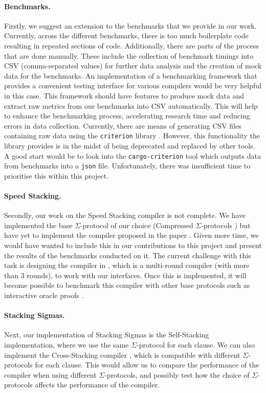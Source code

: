 \paragraph{Benchmarks.} Firstly, we suggest an extension to the benchmarks that we provide in our work. Currently, across the different benchmarks, there is too much boilerplate code resulting in repeated sections of code. Additionally, there are parts of the process that are done manually. These include the collection of benchmark timings into CSV (comma-separated values) for further data analysis and the creation of mock data for the benchmarks. An implementation of a benchmarking framework that provides a convenient testing interface for various compilers would be very helpful in this case. This framework should have features to produce mock data and extract raw metrics from our benchmarks into CSV automatically. This will help to enhance the benchmarking process, accelerating research time and reducing errors in data collection. Currently, there are means of generating CSV files containing raw data using the \texttt{criterion} library \cite{criterion}. However, this functionality the library provides is in the midst of being deprecated and replaced by other tools. A good start would be to look into the \texttt{cargo-criterion} tool \cite{criterion} which outputs data from benchmarks into a \texttt{json} file. Unfortunately, there was insufficient time to prioritise this within this project. 

\paragraph{Speed Stacking.} Secondly, our work on the 
Speed Stacking compiler \cite{SpeedStacking} is not complete. We have implemented the base $\Sigma$-protocol of our choice (Compressed $\Sigma$-protocols \cite{attema}) but have yet to implement the compiler proposed in the paper \cite{SpeedStacking}. Given more time, we would have wanted to include this in our contributions to this project and present the results of the benchmarks conducted on it. The current challenge with this task is designing the compiler in \cite{SpeedStacking}, which is a multi-round compiler (with more than 3 rounds), to work with our interfaces. Once this is implemented, it will become possible to benchmark this compiler with other base protocols such as interactive oracle proofs \cite{iops}. 

\paragraph{Stacking Sigmas.} Next, our implementation of Stacking Sigmas is the Self-Stacking 
implementation, where we use the same $\Sigma$-protocol for each clause. We can also implement
the Cross-Stacking compiler \cite{StackingSigmas}, which is compatible with different $\Sigma$-protocols for each clause.
This would allow us to compare the performance of the compiler when using different $\Sigma$-protocols, 
and possibly test how the choice of $\Sigma$-protocols affects the performance of the compiler. 

